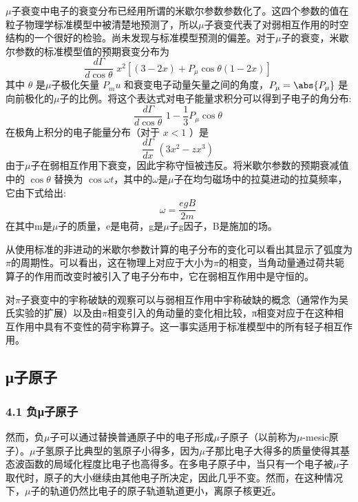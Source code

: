 $\mu$子衰变中电子的衰变分布已经用所谓的米歇尔参数参数化了。这四个参数的值在粒子物理学标准模型中被清楚地预测了，所以$\mu$子衰变代表了对弱相互作用的时空结构的一个很好的检验。尚未发现与标准模型预测的偏差。对于$\mu$子的衰变，米歇尔参数的标准模型值的预期衰变分布为
\begin{equation}
\frac{d\Gamma}{d \cos \theta}\text{~} x^2[(3-2x)+P_\mu \cos \theta(1-2x)]~
\end{equation}
其中 $\theta$ 是$\mu$子极化矢量 $P_mu$ 和衰变电子动量矢量之间的角度，$P_\mu=\abs{P_\mu}$  是向前极化的$\mu$子的比例。将这个表达式对电子能量求积分可以得到子电子的角分布:\begin{equation}
\frac{d\Gamma}{d\cos \theta} \text{~} 1-\frac{1}{3}P_\mu \cos \theta~
\end{equation}
在极角上积分的电子能量分布（对于 $x<1$ ）是
\begin{equation}
\frac{d\Gamma}{dx} \text{~}(3x^2-zx^3)~
\end{equation}
由于$\mu$子在弱相互作用下衰变，因此宇称守恒被违反。将米歇尔参数的预期衰减值中的 $\cos \theta$ 替换为  $\cos \omega t$，其中的$\omega$是$\mu$子在均匀磁场中的拉莫进动的拉莫频率，它由下式给出:\begin{equation}
\omega=\frac{egB}{2m}~
\end{equation}
在其中m是$\mu$子的质量，e是电荷，g是$\mu$子g因子，B是施加的场。

从使用标准的非进动的米歇尔参数计算的电子分布的变化可以看出其显示了弧度为$\pi$的周期性。可以看出，这在物理上对应于大小为$\pi$的相变，当角动量通过荷共轭算子的作用而改变时被引入了电子分布中，它在弱相互作用中是守恒的。

对$\pi$子衰变中的宇称破缺的观察可以与弱相互作用中宇称破缺的概念（通常作为吴氏实验的扩展）以及由$\pi$相变引入的角动量的变化相比较，π相变对应于在这种相互作用中具有不变性的荷宇称算子。这一事实适用于标准模型中的所有轻子相互作用。

\subsection{μ子原子}

\subsubsection{4.1 负μ子原子}
然而，负$\mu$子可以通过替换普通原子中的电子形成$\mu$子原子（以前称为$\mu$-mesic原子）。$\mu$子氢原子比典型的氢原子小得多，因为$\mu$子那比电子大得多的质量使得其基态波函数的局域化程度比电子也高得多。在多电子原子中，当只有一个电子被$\mu$子取代时，原子的大小继续由其他电子所决定，因此几乎不变。然而，在这种情况下，$\mu$子的轨道仍然比电子的原子轨道轨道更小，离原子核更近。

